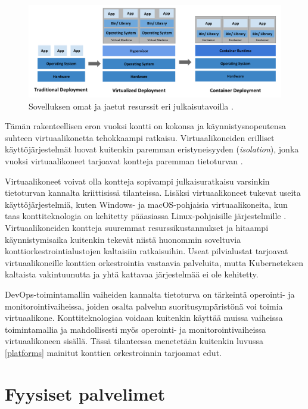 \begin{figure}[ht]
\begin{center}
\includegraphics[width=1\textwidth]{figures/container_evolution.png}
\caption{Sovelluksen omat ja jaetut resurssit eri julkaisutavoilla \cite{Kubernetes23}\label{fig:container}.}
\end{center}
\end{figure}

\pagebreak

Tämän rakenteellisen eron vuoksi kontti on kokonsa ja käynnistysnopeutensa suhteen virtuaalikonetta tehokkaampi ratkaisu.
Virtuaalikoneiden erilliset käyttöjärjestelmät luovat kuitenkin paremman eristyneisyyden (\textit{isolation}), jonka vuoksi virtuaalikoneet tarjoavat kontteja paremman tietoturvan \cite{Sultan19}.

Virtuaalikoneet voivat olla kontteja sopivampi julkaisuratkaisu varsinkin tietoturvan kannalta kriittisissä tilanteissa.
Lisäksi virtuaalikoneet tukevat useita käyttöjärjestelmiä, kuten Windows- ja macOS-pohjaisia virtuaalikoneita, kun taas konttiteknologia on kehitetty pääasiassa Linux-pohjaisille järjestelmille \cite{Watada19}.
Virtuaalikoneiden kontteja suuremmat resurssikustannukset ja hitaampi käynnistymisaika kuitenkin tekevät niistä huonommin soveltuvia konttiorkestrointialustojen kaltaisiin ratkaisuihin.
Useat pilvialustat tarjoavat virtuaalikoneille konttien orkestrointia vastaavia palveluita, mutta Kuberneteksen kaltaista vakintuunutta ja yhtä kattavaa järjestelmää ei ole kehitetty. %

DevOps-toimintamallin vaiheiden kannalta tietoturva on tärkeintä operointi- ja monitorointivaiheissa, joiden osalta palvelun suoritusympäristönä voi toimia virtuaalikone.
Konttiteknologiaa voidaan kuitenkin käyttää muissa vaiheissa toimintamallia ja mahdollisesti myös operointi- ja monitorointivaiheissa virtuaalikoneen sisällä.
Tässä tilanteessa menetetään kuitenkin luvussa \ref{platforms} mainitut konttien orkestroinnin tarjoamat edut.

\section{Fyysiset palvelimet}


